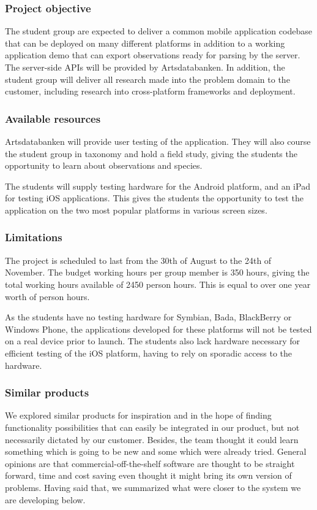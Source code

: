 \subsubsection{Project objective}
The student group are expected to deliver a common mobile application codebase
that can be deployed on many different platforms in addition to a working
application demo that can export observations ready for parsing by the server.
The server-side APIs will be provided by Artsdatabanken. In addition, the
student group will deliver all research made into the problem domain to the
customer, including research into cross-platform frameworks and deployment.

\subsubsection{Available resources}
Artsdatabanken will provide user testing of the application. They will also
course the student group in taxonomy and hold a field study, giving the
students the opportunity to learn about observations and species.

The students will supply testing hardware for the Android platform, and an iPad
for testing iOS applications. This gives the students the opportunity to test
the application on the two most popular platforms in various screen sizes.

\subsubsection{Limitations}
The project is scheduled to last from the 30th of August to the 24th of
November. The budget working hours per group member is 350 hours, giving the
total working hours available of 2450 person hours. This is equal to over one
year worth of person hours.

As the students have no testing hardware for Symbian, Bada, BlackBerry or
Windows Phone, the applications developed for these platforms will not be
tested on a real device prior to launch. The students also lack hardware
necessary for efficient testing of the iOS platform, having to rely on sporadic
access to the hardware.

\subsubsection{Similar products}
We explored similar products for inspiration and in the hope of finding
functionality possibilities that can easily be integrated in our product, but
not necessarily dictated by our customer. Besides, the team thought it could
learn something which is going to be new and some which were already tried.
General opinions are that commercial-off-the-shelf software are thought to be
straight forward, time and cost saving even thought it might bring its own
version of problems\cite{similarproduct:introdn}. Having said that, we
summarized what were closer to the system we are developing below.
